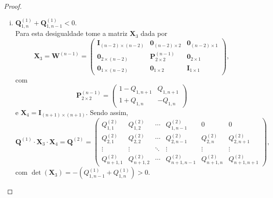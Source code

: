\documentclass[twoside,openright,titlepage,numbers=noenddot,headinclude,  lineheaders footinclude=true,cleardoublepage=empty,
                                BCOR=5mm,paper=a4,fontsize=12pt ]{scrbook}
\theoremstyle{definition}
\begin{document}
\begin{proof}
\begin{enumerate}[(i)]
\item  $\mathbf{Q}^{(1)}_{1,n} + \mathbf{Q}^{(1)}_{1,n-1} < 0$. 
\hfill \\
Para esta desigualdade %
tome a matriz $\mathbf{X}_3$ dada por
\[
\mathbf{X}_3 = 
\mathbf{W}^{(n-1)} = 
\begin{pmatrix}
\mathbf{I}_{(n-2)\times (n-2)}& \mathbf{0}_{(n-2) \times 2} &
\mathbf{0}_{(n-2) \times 1} \\
\mathbf{0}_{2 \times (n-2)} & \mathbf{P}^{(n-1)}_{2 \times 2} &
 \mathbf{0}_{2 \times 1}\\
\mathbf{0}_{1 \times (n-2)} & \mathbf{0}_{1 \times 2}
 & \mathbf{I}_{1\times 1}
\end{pmatrix}
,
\]
com 
\[
\mathbf{P}^{(n-1)}_{2 \times 2}
=
\begin{pmatrix}
1 - Q_{1, n+1} & Q_{1, n+1} \\
1 + Q_{1,n}    & -Q_{1,n}
\end{pmatrix}
\]
e $\bm{X}_4 = \bm{I}_{(n+1) \times (n+1)}$.
Sendo assim,
\[
\bm{Q}^{(1)} \cdot \bm{X}_3 \cdot \bm{X}_4 =
\mathbf{Q}^{(2)} = 
\begin{pmatrix}
Q^{(2)}_{1,1} & Q^{(2)}_{1,2} & \cdots & Q^{(2)}_{1,n-1} & 0&0\\
Q^{(2)}_{2,1} & Q^{(2)}_{2,2} & \cdots & Q^{(2)}_{2,n-1}&
 Q^{(2)}_{2,n}&
Q^{(2)}_{2,n+1}\\
\vdots & \vdots & \ddots & \vdots & \vdots & \vdots \\
Q^{(2)}_{n+1,1} & Q^{(2)}_{n+1,2} & \cdots & Q^{(2)}_{n+1,n-1}&
 Q^{(2)}_{n+1,n} &
Q^{(2)}_{n+1,n+1}
\end{pmatrix}
,
\]
com 
$\det(\mathbf{X}_3) = -( Q^{(1)}_{1,n-1} + Q^{(1)}_{1, n}) > 0$.


\end{enumerate}
\end{proof}
\end{document}
